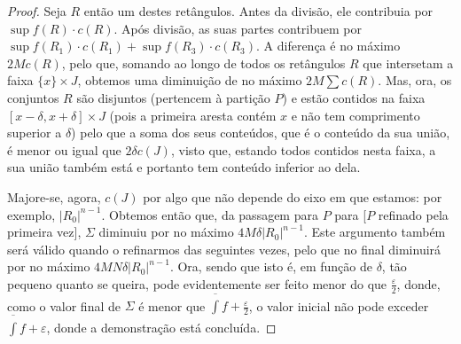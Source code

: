 \documentclass{article}
\newcommand{\diam}[1]{\lvert #1 \rvert}
\begin{document}
\begin{proof}
	Seja $R$ então um destes retângulos. Antes da divisão, ele contribuia por $\sup f(R) \cdot c(R)$. Após divisão, as suas partes contribuem por $\sup f(R_1) \cdot c(R_1) + \sup f(R_3) \cdot c(R_3)$. A diferença é no máximo $2 M c(R)$, pelo que, somando ao longo de todos os retângulos $R$ que intersetam a faixa $\{x\} \times J$, obtemos uma diminuição de no máximo $2 M \sum c(R)$. Mas, ora, os conjuntos $R$ são disjuntos (pertencem à partição $P$) e estão contidos na faixa $\left[ x - \delta, x + \delta \right] \times J$ (pois a primeira aresta contém $x$ e não tem comprimento superior a $\delta$) pelo que a soma dos seus conteúdos, que é o conteúdo da sua união, é menor ou igual que $2 \delta c(J)$, visto que, estando todos contidos nesta faixa, a sua união também está e portanto tem conteúdo inferior ao dela.
	
	Majore-se, agora, $c(J)$ por algo que não depende do eixo em que estamos: por exemplo, $\diam{R_0}^{n-1}$. Obtemos então que, da passagem para $P$ para [$P$ refinado pela primeira vez], $\Sigma$ diminuiu por no máximo $4 M \delta \diam{R_0}^{n-1}$. Este argumento também será válido quando o refinarmos das seguintes vezes, pelo que no final diminuirá por no máximo $4 M N \delta \diam{R_0}^{n-1}$. Ora, sendo que isto é, em função de $\delta$, tão pequeno quanto se queira, pode evidentemente ser feito menor do que $\frac \varepsilon 2$, donde, como o valor final de $\Sigma$ é menor que $\overline{\int} f + \frac \varepsilon 2$, o valor inicial não pode exceder $\overline{\int} f + \varepsilon$, donde a demonstração está concluída.
	\end{proof}
\end{document}
